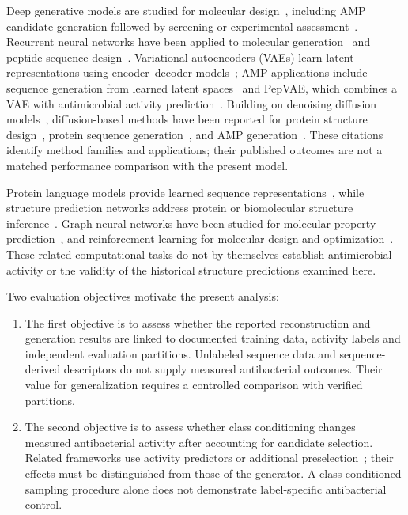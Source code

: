 \documentclass[journal]{IEEEtran}
\begin{document}
Deep generative models are studied for molecular design~\cite{meyers2021denovo,zhavoronkov2023generative}, including AMP candidate generation followed by screening or experimental assessment~\cite{das2021accelerated,szymczak2023discovering}. Recurrent neural networks have been applied to molecular generation~\cite{segler2018generating,kotsias2020direct} and peptide sequence design~\cite{muller2018recurrent}. Variational autoencoders (VAEs) learn latent representations using encoder--decoder models~\cite{kingma2014autoencoding}; AMP applications include sequence generation from learned latent spaces~\cite{dean2020variational} and PepVAE, which combines a VAE with antimicrobial activity prediction~\cite{li2021pepvae}. Building on denoising diffusion models~\cite{ho2020denoising}, diffusion-based methods have been reported for protein structure design~\cite{watson2023denovo}, protein sequence generation~\cite{huang2024cpdiffusion}, and AMP generation~\cite{jin2024artificial}. These citations identify method families and applications; their published outcomes are not a matched performance comparison with the present model.

Protein language models provide learned sequence representations~\cite{rives2021biological,elnaggar2021prottrans,brandes2022proteinbert,lin2023evolutionary}, while structure prediction networks address protein or biomolecular structure inference~\cite{jumper2021highly,baek2021accurate,abramson2024accurate}. Graph neural networks have been studied for molecular property prediction~\cite{wieder2020compact,xiong2020pushing,maziarka2024transfer}, and reinforcement learning for molecular design and optimization~\cite{olivecrona2017molecular,zhou2019optimization,wang2023denovo}. These related computational tasks do not by themselves establish antimicrobial activity or the validity of the historical structure predictions examined here.

Two evaluation objectives motivate the present analysis:
\begin{enumerate}
\item The first objective is to assess whether the reported reconstruction and generation results are linked to documented training data, activity labels and independent evaluation partitions. Unlabeled sequence data and sequence-derived descriptors do not supply measured antibacterial outcomes. Their value for generalization requires a controlled comparison with verified partitions.
\item The second objective is to assess whether class conditioning changes measured antibacterial activity after accounting for candidate selection. Related frameworks use activity predictors or additional preselection~\cite{li2021pepvae,szymczak2023discovering}; their effects must be distinguished from those of the generator. A class-conditioned sampling procedure alone does not demonstrate label-specific antibacterial control.
\end{enumerate}
\end{document}
